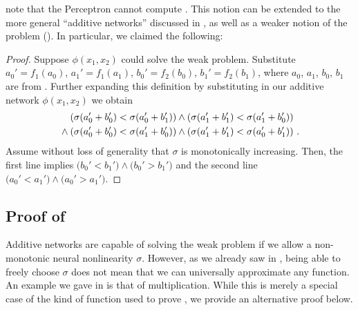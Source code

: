  note that the Perceptron cannot compute \XOR.
This notion can be extended to the more general \enquote{additive networks} discussed in , as well as a weaker notion of the \XOR problem ().
In particular, we claimed the following:

\ThmWeakXor*

\begin{proof}
Suppose $\phi(x_1, x_2)$ could solve the weak \XOR problem. Substitute $a_0' = f_1(a_0)$, $a_1' = f_1(a_1)$, $b_0' = f_2(b_0)$, $b_1' = f_2(b_1)$, where $a_0$, $a_1$, $b_0$, $b_1$ are from .
Further expanding this definition by substituting in our additive network $\phi(x_1, x_2)$ we obtain
	\begin{align*}
	&\hphantom{\wedge} \;    \left( \sigma(a_0' + b_0') < \sigma(a_0' + b_1') \right)
	 \wedge   \left( \sigma(a_1' + b_1') < \sigma(a_1' + b_0') \right) \\
	&\wedge   \left( \sigma(a_0' + b_0') < \sigma(a_1' + b_0') \right) 
	 \wedge   \left( \sigma(a_1' + b_1') < \sigma(a_0' + b_1') \right) \,.
	\end{align*}
	Assume without loss of generality that $\sigma$ is monotonically increasing. Then, the first line implies $\big(b_0' < b_1' \big) \wedge \big( b_0' > b_1' \big)$ and the second line $\big(a_0' < a_1' \big) \wedge \big( a_0' > a_1' \big)$. \Lightning
\end{proof}

\subsection{Proof of }
\label{app:thm_multiplication}

Additive networks are capable of solving the weak \XOR problem if we allow a non-monotonic neural nonlinearity $\sigma$.
However, as we already saw in , being able to freely choose $\sigma$ does not mean that we can universally approximate any function.
An example we gave in  is that of multiplication.
While this is merely a special case of the kind of function used to prove , we provide an alternative proof below.

\ThmMultiplication*

